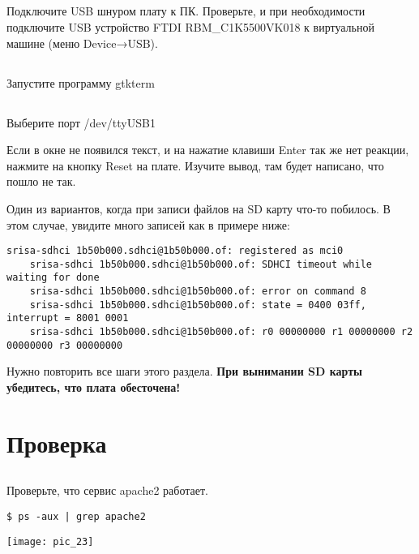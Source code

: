 \subsection{}Подключите USB шнуром плату к ПК. Проверьте, и при необходимости подключите USB устройство FTDI RBM\_C1K5500VK018 к виртуальной машине (меню Device→USB).

\subsection{} Запустите программу gtkterm 

\subsection{} Выберите порт /dev/ttyUSB1 

Если в окне не появился текст, и на нажатие клавиши Enter так же нет реакции,  нажмите на кнопку Reset на плате. Изучите вывод, там будет написано, что пошло не так.

Один из вариантов, когда при записи файлов на SD карту что-то побилось. В этом случае, увидите много записей как в примере ниже:
\begin{lstlisting}[style=stdout]
	srisa-sdhci 1b50b000.sdhci@1b50b000.of: registered as mci0
	srisa-sdhci 1b50b000.sdhci@1b50b000.of: SDHCI timeout while waiting for done
	srisa-sdhci 1b50b000.sdhci@1b50b000.of: error on command 8
	srisa-sdhci 1b50b000.sdhci@1b50b000.of: state = 0400 03ff, interrupt = 8001 0001
	srisa-sdhci 1b50b000.sdhci@1b50b000.of: r0 00000000 r1 00000000 r2 00000000 r3 00000000
\end{lstlisting}

Нужно повторить все шаги этого раздела. \textbf{При вынимании SD карты убедитесь, что плата обесточена!}

\section{Проверка}

\subsection{}Проверьте, что сервис apache2 работает. 
\begin{lstlisting}[style=bash]
$ ps -aux | grep apache2
\end{lstlisting}
\begin{center}
	\texttt{[image: pic\_23]}
\end{center}

